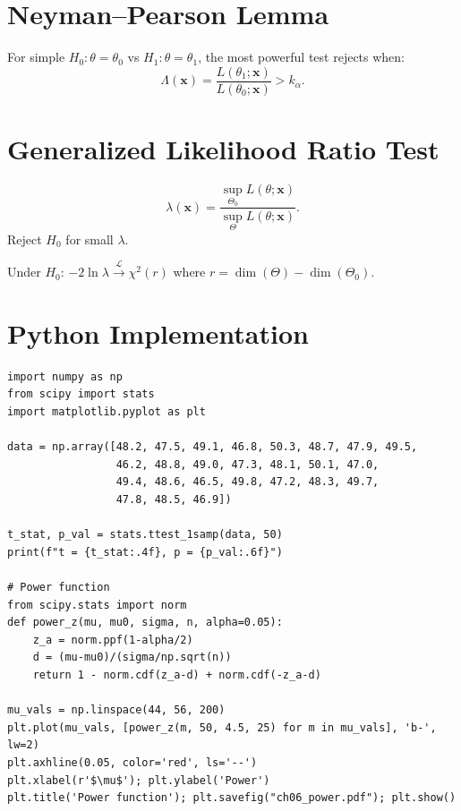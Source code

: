 \section{Neyman--Pearson Lemma}

\begin{theorem}
For simple $H_0:\theta=\theta_0$ vs $H_1:\theta=\theta_1$, the most powerful test rejects when:
\[
\Lambda(\mathbf{x}) = \frac{L(\theta_1;\mathbf{x})}{L(\theta_0;\mathbf{x})} > k_\alpha.
\]
\end{theorem}

\section{Generalized Likelihood Ratio Test}

\begin{definition}
\[
\lambda(\mathbf{x}) = \frac{\sup_{\Theta_0} L(\theta;\mathbf{x})}{\sup_{\Theta} L(\theta;\mathbf{x})}.
\]
Reject $H_0$ for small $\lambda$.
\end{definition}

\begin{theorem}
Under $H_0$: $-2\ln\lambda \xrightarrow{\mathcal{L}} \chi^2(r)$ where $r=\dim(\Theta)-\dim(\Theta_0)$.
\end{theorem}

\section{Python Implementation}

\begin{python}
\begin{verbatim}
import numpy as np
from scipy import stats
import matplotlib.pyplot as plt

data = np.array([48.2, 47.5, 49.1, 46.8, 50.3, 48.7, 47.9, 49.5,
                 46.2, 48.8, 49.0, 47.3, 48.1, 50.1, 47.0,
                 49.4, 48.6, 46.5, 49.8, 47.2, 48.3, 49.7,
                 47.8, 48.5, 46.9])

t_stat, p_val = stats.ttest_1samp(data, 50)
print(f"t = {t_stat:.4f}, p = {p_val:.6f}")

# Power function
from scipy.stats import norm
def power_z(mu, mu0, sigma, n, alpha=0.05):
    z_a = norm.ppf(1-alpha/2)
    d = (mu-mu0)/(sigma/np.sqrt(n))
    return 1 - norm.cdf(z_a-d) + norm.cdf(-z_a-d)

mu_vals = np.linspace(44, 56, 200)
plt.plot(mu_vals, [power_z(m, 50, 4.5, 25) for m in mu_vals], 'b-', lw=2)
plt.axhline(0.05, color='red', ls='--')
plt.xlabel(r'$\mu$'); plt.ylabel('Power')
plt.title('Power function'); plt.savefig("ch06_power.pdf"); plt.show()
\end{verbatim}
\end{python}

